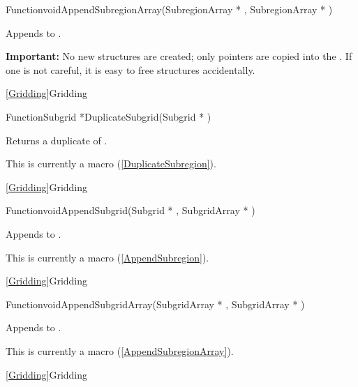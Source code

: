 {\newpage\clearpage
{}%
\begin{deftypefn}{Function}{void}{AppendSubregionArray}({SubregionArray *} , {SubregionArray *} )
\par
\DESCRIPTION
Appends  to .
\par
\NOTES
{\bf Important:}
No new  structures are created; only pointers
are copied into the .
If one is not careful, it is easy to free  structures
accidentally.
\par
\SEEALSO
\vref{Gridding}{Gridding}
\par
\end{deftypefn}%
\lthtmlfigureZ
\lthtmlcheckvsize\clearpage}

{\newpage\clearpage
{}%
\begin{deftypefn}
{Function}{Subgrid *}{DuplicateSubgrid}({Subgrid *} )
\par
\DESCRIPTION
Returns a duplicate of .
\par
\NOTES
This is currently a macro (\ref{DuplicateSubregion}).
\par
\SEEALSO
\vref{Gridding}{Gridding}
\par
\end{deftypefn}%
\lthtmlfigureZ
\lthtmlcheckvsize\clearpage}

{\newpage\clearpage
{}%
\begin{deftypefn}
{Function}{void}{AppendSubgrid}({Subgrid *} , {SubgridArray *} )
\par
\DESCRIPTION
Appends  to .
\par
\NOTES
This is currently a macro (\ref{AppendSubregion}).
\par
\SEEALSO
\vref{Gridding}{Gridding}
\par
\end{deftypefn}%
\lthtmlfigureZ
\lthtmlcheckvsize\clearpage}

{\newpage\clearpage
{}%
\begin{deftypefn}
{Function}{void}{AppendSubgridArray}({SubgridArray *} , {SubgridArray *} )
\par
\DESCRIPTION
Appends  to .
\par
\NOTES
This is currently a macro (\ref{AppendSubregionArray}).
\par
\SEEALSO
\vref{Gridding}{Gridding}
\par
\end{deftypefn}%
\lthtmlfigureZ
\lthtmlcheckvsize\clearpage}

